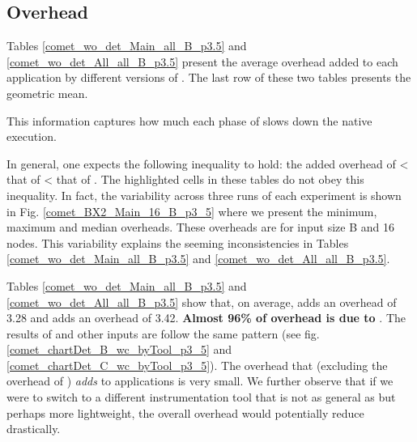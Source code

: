 






  
  
\subsection{ \pininit Overhead} 
\label{subsec:pinit}
Tables \ref{comet_wo_det_Main_all_B_p3.5} and
\ref{comet_wo_det_All_all_B_p3.5} present the average overhead added to each
application by different versions of \parlot. 
%
The last row of these two tables
presents the geometric mean.

%
This information captures how much each
phase of \parlot slows down the native execution. 


In general, one 
expects the following inequality to hold:
 the added overhead of \pininit < that of \parlot
< that of \parlotnc. 
%
The highlighted cells in these tables do not
obey this inequality.
%
In fact, the variability across three runs of each experiment
is shown in Fig. \ref{comet_BX2_Main_16_B_p3_5}
where we present the minimum, maximum and median overheads.
%
These
overheads are for input size B and 16 nodes. 
%
This variability explains the seeming inconsistencies in  Tables
\ref{comet_wo_det_Main_all_B_p3.5} and
\ref{comet_wo_det_All_all_B_p3.5}.


Tables \ref{comet_wo_det_Main_all_B_p3.5} and
\ref{comet_wo_det_All_all_B_p3.5} show that, on average, \pininit adds
an overhead of 3.28  and \parlota adds an overhead of 3.42. 
%
\textbf{Almost 96\%
of \parlota overhead is due to \pin}. 
%
The results of \parlotm and
other inputs are follow the same pattern
(see fig. \ref{comet_chartDet_B_wc_byTool_p3_5} and \ref{comet_chartDet_C_wc_byTool_p3_5}). 
%
The overhead that \parlot (excluding the overhead of \pininit) {\em adds}
to applications is very small.
%
We further observe that if we were to switch to a different
instrumentation tool that is not as general as \pin but perhaps more
lightweight, the overall overhead would potentially reduce drastically. \\






